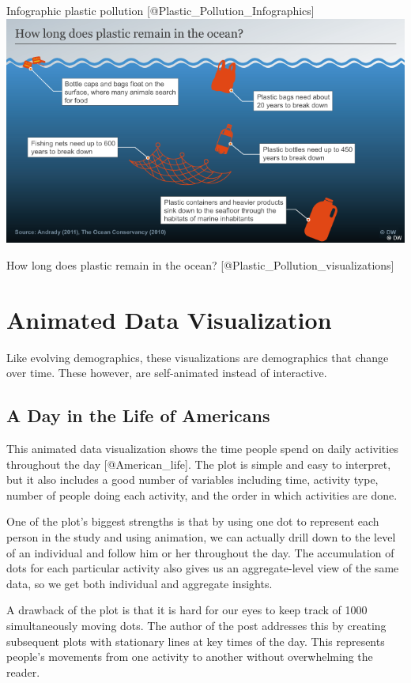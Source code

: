 \documentclass[]{book}
\theoremstyle{definition}
\theoremstyle{definition}
\theoremstyle{definition}
\theoremstyle{remark}
\begin{document}
Infographic plastic pollution {[}@Plastic\_Pollution\_Infographics{]}
\includegraphics{images/ocean_plastic.png}

How long does plastic remain in the ocean?
{[}@Plastic\_Pollution\_visualizations{]}

\section{Animated Data Visualization}\label{animated-data-visualization}

Like evolving demographics, these visualizations are demographics that
change over time. These however, are self-animated instead of
interactive.

\subsection{A Day in the Life of
Americans}\label{a-day-in-the-life-of-americans}

This animated data visualization shows the time people spend on daily
activities throughout the day {[}@American\_life{]}. The plot is simple
and easy to interpret, but it also includes a good number of variables
including time, activity type, number of people doing each activity, and
the order in which activities are done.

One of the plot's biggest strengths is that by using one dot to
represent each person in the study and using animation, we can actually
drill down to the level of an individual and follow him or her
throughout the day. The accumulation of dots for each particular
activity also gives us an aggregate-level view of the same data, so we
get both individual and aggregate insights.

A drawback of the plot is that it is hard for our eyes to keep track of
1000 simultaneously moving dots. The author of the post addresses this
by creating subsequent plots with stationary lines at key times of the
day. This represents people's movements from one activity to another
without overwhelming the reader.
\end{document}
